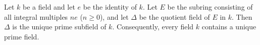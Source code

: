 Let $k$ be a field and let $e$ be the identity of $k$. Let $E$ be the subring consisting of all integral multiples $ne$ ($n \ge 0$), and let $\Delta$ be the quotient field of $E$ in $k$. Then $\Delta$ is the unique prime subfield of $k$. Consequently, every field $k$ contains a unique prime field.
